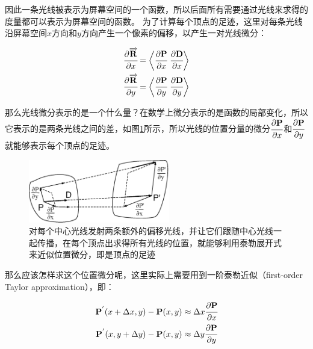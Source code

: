 因此一条光线被表示为屏幕空间的一个函数，所以后面所有需要通过光线来求得的度量都可以表示为屏幕空间的函数。 为了计算每个顶点的足迹，这里对每条光线沿屏幕空间$x$方向和$y$方向产生一个像素的偏移，以产生一对光线微分：

\begin{equation}
	\begin{aligned}
		 \cfrac{{\rm \partial}\overrightarrow{\mathbf{R}}}{{\rm \partial} x}&=\bigg\langle  \cfrac{{\rm \partial}\mathbf{P}}{{\rm \partial} x} \text{ } \cfrac{{\rm \partial}\mathbf{D}}{{\rm \partial} x}\bigg\rangle \\
		 \cfrac{{\rm \partial}\overrightarrow{\mathbf{R}}}{{\rm \partial} y}&=\bigg\langle  \cfrac{{\rm \partial}\mathbf{P}}{{\rm \partial} y} \text{ } \cfrac{{\rm \partial}\mathbf{D}}{{\rm \partial} y}\bigg\rangle
	\end{aligned}
\end{equation}

那么光线微分表示的是一个什么量？在数学上微分表示的是函数的局部变化，所以它表示的是两条光线之间的差，如图\ref{f:pt-ray-differentials}所示，所以光线的位置分量的微分$ \cfrac{{\rm \partial}\mathbf{P}}{{\rm \partial} x}$和$ \cfrac{{\rm \partial}\mathbf{P}}{{\rm \partial} y}$就能够表示每个顶点的足迹。

\begin{figure}
	\sidecaption
	\includegraphics[width=0.55\textwidth]{figures/pt/ray-differentials}
	\caption{对每个中心光线发射两条额外的偏移光线，并让它们跟随中心光线一起传播，在每个顶点出求得所有光线的位置，就能够利用泰勒展开式来近似位置微分，即是顶点的足迹}
	\label{f:pt-ray-differentials}
\end{figure}

那么应该怎样求这个位置微分呢，这里实际上需要用到一阶泰勒近似（first-order Taylor approximation），即：

\begin{equation}\label{e:pt-first-order-taylor}
	\begin{aligned}
		\mathbf{P}^{'}(x+\Delta x,y)-\mathbf{P}(x,y)& \approx\Delta x \cfrac{{\rm \partial}\mathbf{P}}{{\rm \partial} x}\\
		\mathbf{P}^{'}(x,y+\Delta y)-\mathbf{P}(x,y)& \approx\Delta y \cfrac{{\rm \partial}\mathbf{P}}{{\rm \partial} y}\\
	\end{aligned}
\end{equation}

